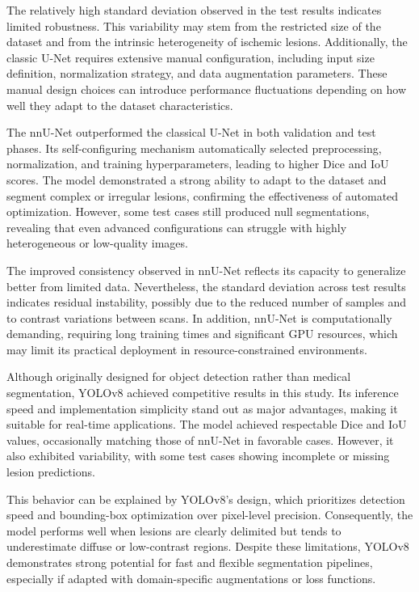 \documentclass[12pt]{article}
\begin{document}
The relatively high standard deviation observed in the test results indicates limited robustness. This variability may stem from the restricted size of the dataset and from the intrinsic heterogeneity of ischemic lesions. Additionally, the classic U-Net requires extensive manual configuration, including input size definition, normalization strategy, and data augmentation parameters. These manual design choices can introduce performance fluctuations depending on how well they adapt to the dataset characteristics.

The nnU-Net outperformed the classical U-Net in both validation and test phases. Its self-configuring mechanism automatically selected preprocessing, normalization, and training hyperparameters, leading to higher Dice and IoU scores. The model demonstrated a strong ability to adapt to the dataset and segment complex or irregular lesions, confirming the effectiveness of automated optimization. However, some test cases still produced null segmentations, revealing that even advanced configurations can struggle with highly heterogeneous or low-quality images.

The improved consistency observed in nnU-Net reflects its capacity to generalize better from limited data. Nevertheless, the standard deviation across test results indicates residual instability, possibly due to the reduced number of samples and to contrast variations between scans. In addition, nnU-Net is computationally demanding, requiring long training times and significant GPU resources, which may limit its practical deployment in resource-constrained environments.

Although originally designed for object detection rather than medical segmentation, YOLOv8 achieved competitive results in this study. Its inference speed and implementation simplicity stand out as major advantages, making it suitable for real-time applications. The model achieved respectable Dice and IoU values, occasionally matching those of nnU-Net in favorable cases. However, it also exhibited variability, with some test cases showing incomplete or missing lesion predictions.

This behavior can be explained by YOLOv8’s design, which prioritizes detection speed and bounding-box optimization over pixel-level precision. Consequently, the model performs well when lesions are clearly delimited but tends to underestimate diffuse or low-contrast regions. Despite these limitations, YOLOv8 demonstrates strong potential for fast and flexible segmentation pipelines, especially if adapted with domain-specific augmentations or loss functions.
\end{document}
